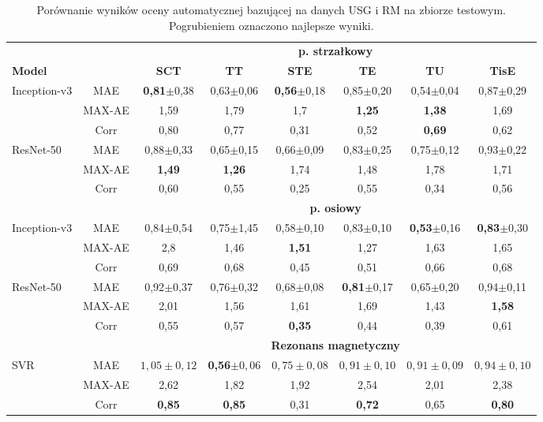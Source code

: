 \renewcommand{\arraystretch}{1.2}
\begin{table}[h]
	\scriptsize
	\setlength{\tabcolsep}{1pt}
	\centering
	\caption{Porównanie wyników oceny automatycznej bazującej na danych USG i RM na zbiorze testowym. Pogrubieniem oznaczono najlepsze wyniki.}
	\label{tab:USGvsRM-cross-validation}
	\vspace{-0.5cm}
	\begin{tabular}{lc||c|c|c|c|c|c}
		& & \multicolumn{6}{c}{\textbf{p. strzałkowy}} \\
		\textbf{Model} & & \textbf{SCT} & \textbf{TT} & \textbf{STE} & \textbf{TE} & \textbf{TU} & \textbf{TisE} \\ \hline \hline
		Inception-v3 & MAE & \textbf{0,81}$\pm$0,38 & 0,63$\pm$0,06 & \textbf{0,56}$\pm$0,18 & 0,85$\pm$0,20 & 0,54$\pm$0,04 & 0,87$\pm$0,29 \\
		& MAX-AE & 1,59 & 1,79 & 1,7 & \textbf{1,25} & \textbf{1,38} & 1,69 \\
		& Corr & 0,80 & 0,77 & 0,31 & 0,52 & \textbf{0,69} & 0,62 \\ \hline
		ResNet-50 & MAE & 0,88$\pm$0,33 & 0,65$\pm$0,15 & 0,66$\pm$0,09 & 0,83$\pm$0,25 & 0,75$\pm$0,12 & 0,93$\pm$0,22 \\
		& MAX-AE & \textbf{1,49} & \textbf{1,26} & 1,74 & 1,48 & 1,78 & 1,71 \\
		& Corr & 0,60 & 0,55 & 0,25 & 0,55 & 0,34 & 0,56 \\
		\hline \hline
		& & \multicolumn{6}{c}{\textbf{p. osiowy}} \\
		
		Inception-v3 & MAE & 0,84$\pm$0,54 & 0,75$\pm$1,45 & 0,58$\pm$0,10 & 0,83$\pm$0,10 & \textbf{0,53}$\pm$0,16 & \textbf{0,83}$\pm$0,30 \\
		& MAX-AE & 2,8 & 1,46 & \textbf{1,51} & 1,27 & 1,63 & 1,65 \\
		& Corr & 0,69 & 0,68 & 0,45 & 0,51 & 0,66 & 0,68 \\ \hline
		ResNet-50 & MAE & 0,92$\pm$0,37 & 0,76$\pm$0,32 & 0,68$\pm$0,08 & \textbf{0,81}$\pm$0,17 & 0,65$\pm$0,20 & 0,94$\pm$0,11 \\
		& MAX-AE & 2,01 & 1,56 & 1,61 & 1,69& 1,43 & \textbf{1,58}\\
		& Corr & 0,55 & 0,57 & \textbf{0,35} & 0,44 & 0,39 & 0,61 \\ \hline \hline
		& & \multicolumn{6}{c}{\textbf{Rezonans magnetyczny}} \\
		
		SVR & MAE & $1,05\pm0,12$ & \textbf{0,56}$\pm0,06$ & $0,75\pm0,08$ & $0,91\pm0,10$ & $0,91\pm0,09$ & $0,94\pm0,10$\\
		& MAX-AE & 2,62 & 1,82 & 1,92 & 2,54 & 2,01 & 2,38 \\
		& Corr   & \textbf{0,85} & \textbf{0,85} & 0,31 & \textbf{0,72} & 0,65 & \textbf{0,80} \\
		 
	\end{tabular}
\end{table}
\renewcommand{\arraystretch}{1}


